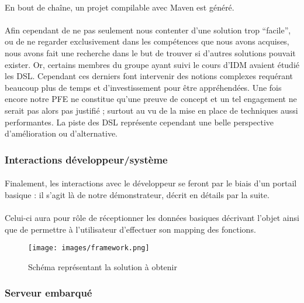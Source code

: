 \documentclass[nocopyrightspace]{sigplanconf}
\begin{document}
			\paragraph{}
			En bout de chaîne, un projet compilable avec Maven est généré.

			\paragraph{}
			Afin cependant de ne pas seulement nous contenter d’une solution trop “facile”, ou de ne regarder exclusivement dans les compétences que nous avons acquises, nous avons fait une recherche dans le but de trouver si d’autres solutions pouvait exister. Or, certains membres du groupe ayant suivi le cours d’IDM avaient étudié les DSL\cite{dsl}. Cependant ces derniers font intervenir des notions complexes requérant beaucoup plus de temps et d’investissement pour être appréhendées. Une fois encore notre PFE ne constitue qu’une preuve de concept et un tel engagement ne serait pas alors pas justifié ; surtout au vu de la mise en place de techniques aussi performantes. La piste des DSL représente cependant une belle perspective d’amélioration ou d’alternative.

		\subsubsection{Interactions développeur/système}

			\paragraph{}
			Finalement, les interactions avec le développeur se feront par le biais d’un portail basique : il s’agit là de notre démonstrateur, décrit en détails par la suite.
			
			\paragraph{}
			Celui-ci aura pour rôle de réceptionner les données basiques décrivant l’objet ainsi que de permettre à l’utilisateur d’effectuer son mapping des fonctions.

			\begin{figure}[h]
				\centering
				\texttt{[image: images/framework.png]}
				\caption{Schéma représentant la solution à obtenir}
			\end{figure}

		\subsubsection{Serveur embarqué}
\end{document}
